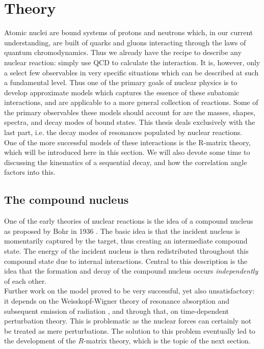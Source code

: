 \section{Theory} \label{section: theory}
Atomic nuclei are bound systems of protons and neutrons which, in our current understanding, are built of quarks and gluons interacting through the laws of quantum chromodynamics. Thus we already have the recipe to describe any nuclear reaction: simply use QCD to calculate the interaction. It is, however, only a select few observables in very specific situations which can be described at such a fundamental level. Thus one of the primary goals of nuclear physics is to develop approximate models which captures the essence of these subatomic interactions, and are applicable to a more general collection of reactions. Some of the primary observables these models should account for are the masses, shapes, spectra, and decay modes of bound states. This thesis deals exclusively with the last part, i.e. the decay modes of resonances populated by nuclear reactions. \\

One of the more successful models of these interactions is the R-matrix theory, which will be introduced here in this section. We will also devote some time to discussing the kinematics of a sequential decay, and how the correlation angle factors into this. 

\subsection{The compound nucleus}
One of the early theories of nuclear reactions is the idea of a compound nucleus as proposed by Bohr in 1936 \cite{Bohr}. The basic idea is that the incident nucleus is momentarily captured by the target, thus creating an intermediate compound state. The energy of the incident nucleus is then redistributed throughout this compound state due to internal interactions. Central to this description is the idea that the formation and decay of the compound nucleus occurs \textit{independently} of each other. \\

Further work on the model proved to be very successful, yet also unsatisfactory: it depends on the Weisskopf-Wigner theory of resonance absorption and subsequent emission of radiation \cite{Weisskopf}, and through that, on time-dependent perturbation theory. This is problematic as the nuclear forces can certainly not be treated as mere perturbations. The solution to this problem eventually led to the development of the $R$-matrix theory, which is the topic of the next section. 

